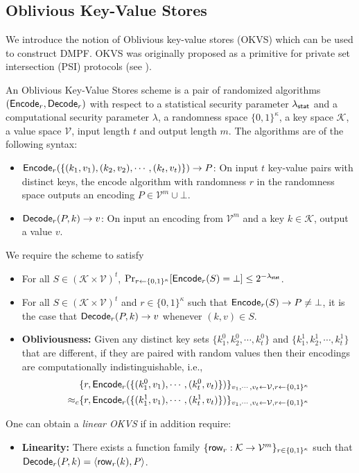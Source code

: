 \subsection{Oblivious Key-Value Stores}\label{sec:prelim_okvs}
We introduce the notion of Oblivious key-value stores (OKVS) which can be used to construct DMPF. OKVS was originally proposed as a primitive for private set intersection (PSI) protocols (see \cite{cryptoeprint:2021/883,cryptoeprint:2022/320}). 
\begin{definition}\label{def:OKVS}
  An Oblivious Key-Value Stores scheme is a pair of randomized algorithms $({\sf Encode}_r,{\sf Decode}_r)$ with respect to a statistical security parameter $\lambda_{\sf stat}$ and a computational security parameter $\lambda$, a randomness space $\{0,1\}^\kappa$, a key space $\mathcal{K}$, a value space $\mathcal{V}$, input length $t$ and output length $m$. The algorithms are of the following syntax: 
  \begin{itemize}
    \item ${\sf Encode}_r(\{(k_1,v_1),(k_2,v_2),\cdots,(k_t,v_t)\})\rightarrow P$: On input $t$ key-value pairs with distinct keys, the encode algorithm with randomness $r$ in the randomness space outputs an encoding $P\in\mathcal{V}^m\cup\bot$.
    \item ${\sf Decode}_r(P,k)\rightarrow v$: On input an encoding from $\mathcal{V}^m$ and a key $k\in\mathcal{K}$, output a value $v$. 
  \end{itemize}
  We require the scheme to satisfy
  \begin{itemize}
    \item For all $S\in(\mathcal{K}\times\mathcal{V})^t$, $\Pr_{r\leftarrow\{0,1\}^\kappa}[{\sf Encode}_r(S)=\bot]\le 2^{-\lambda_{\sf stat}}$. 
    \item For all $S\in(\mathcal{K}\times \mathcal{V})^t$ and $r\in \{0,1\}^\kappa$ such that ${\sf Encode}_r(S)\rightarrow P\not=\bot$, it is the case that ${\sf Decode}_r(P,k)\rightarrow v$ whenever $(k,v)\in S$. 
    \item \textbf{Obliviousness: }Given any distinct key sets $\{k_1^0,k_2^0,\cdots,k_t^0\}$ and $\{k_1^1,k_2^1,\cdots,k_t^1\}$ that are different, if they are paired with random values then their encodings are computationally indistinguishable, i.e., 
  \begin{align*}
    &\{r, {\sf Encode}_r(\{(k_1^0,v_1),\cdots,(k_t^0,v_t)\})\}_{v_1,\cdots,v_t\leftarrow \mathcal{V},r\leftarrow\{0,1\}^\kappa}\\
    \approx_c &\{r, {\sf Encode}_r(\{(k_1^1,v_1),\cdots,(k_t^1,v_t)\})\}_{v_1,\cdots,v_t\leftarrow \mathcal{V},r\leftarrow\{0,1\}^\kappa}
  \end{align*}
  \end{itemize}
One can obtain a \emph{linear OKVS} if in addition require:
\begin{itemize}
  \item \textbf{Linearity: }There exists a function family $\{{\sf row}_r:\mathcal{K}\rightarrow\mathcal{V}^m\}_{r\in\{0,1\}^\kappa}$ such that ${\sf Decode}_r(P,k) = \langle {\sf row}_r(k), P \rangle$. 
\end{itemize}
\end{definition}
